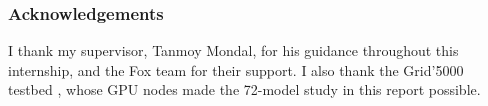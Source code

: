 \subsubsection*{Acknowledgements}

I thank my supervisor, Tanmoy Mondal, for his guidance throughout this internship, and the Fox team
for their support. I also thank the Grid'5000 testbed \citep{balouek2013grid5000}, whose GPU nodes
made the 72-model study in this report possible.
